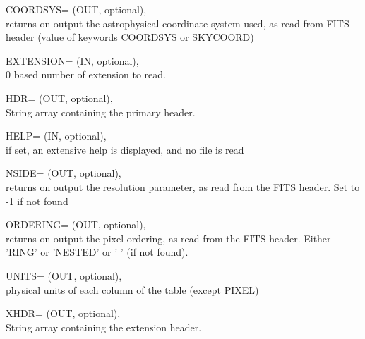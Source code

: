 \begin{keywords}
  \begin{kwlist}{} %
	 \item[{COORDSYS=}] 
	        (OUT, optional), \\
	        returns on output the astrophysical coordinate system used, 
		as read from FITS header (value of keywords COORDSYS or SKYCOORD)

    	\item[EXTENSION=]%
		(IN, optional), \\
		0 based number of extension to read.  

    	\item[HDR=]%
		(OUT, optional), \\
		String array containing the primary header. 

	\item[{HELP=}] 
	        (IN, optional), \\ if set, an extensive help is displayed, and no file is read

	 \item[{NSIDE=}]  
		(OUT, optional), \\
	        returns on output the \healpix resolution parameter, as read
		from the FITS header. Set to -1 if not found

	 \item[{ORDERING=}] 
	        (OUT, optional), \\
	        returns on output the pixel ordering, as read from the FITS
	        header. Either 'RING' or 'NESTED' or ' ' (if not found).

	 \item[{UNITS=}] 
	        (OUT, optional), \\ physical units of each column of the table (except PIXEL)

    	\item[XHDR=]%
		(OUT, optional), \\
		String array containing the extension header. 

  \end{kwlist}
\end{keywords}


